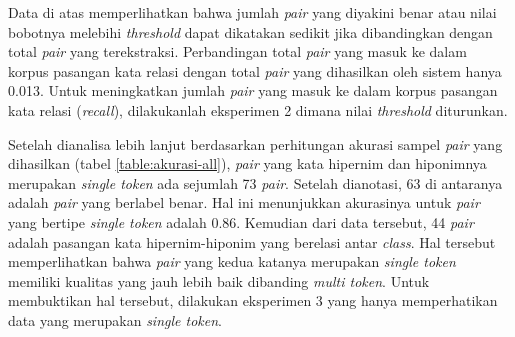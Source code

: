 Data di atas memperlihatkan bahwa jumlah \textit{pair} yang diyakini benar atau nilai bobotnya melebihi \textit{threshold} dapat dikatakan sedikit jika dibandingkan dengan total \textit{pair} yang terekstraksi. Perbandingan total \textit{pair} yang masuk ke dalam korpus pasangan kata relasi dengan total \textit{pair} yang dihasilkan oleh sistem hanya 0.013. Untuk meningkatkan jumlah \textit{pair} yang masuk ke dalam korpus pasangan kata relasi (\textit{recall}), dilakukanlah eksperimen 2 dimana nilai \textit{threshold} diturunkan.

Setelah dianalisa lebih lanjut berdasarkan perhitungan akurasi sampel \textit{pair} yang dihasilkan (tabel \ref{table:akurasi-all}), \textit{pair} yang kata hipernim dan hiponimnya merupakan \textit{single token} ada sejumlah 73 \textit{pair}. Setelah dianotasi, 63 di antaranya adalah \textit{pair} yang berlabel benar. Hal ini menunjukkan akurasinya untuk \textit{pair} yang bertipe \textit{single token} adalah 0.86. Kemudian dari data tersebut, 44 \textit{pair} adalah pasangan kata hipernim-hiponim yang berelasi antar \textit{class}. Hal tersebut memperlihatkan bahwa \textit{pair} yang kedua katanya merupakan \textit{single token} memiliki kualitas yang jauh lebih baik dibanding \textit{multi token}. Untuk membuktikan hal tersebut, dilakukan eksperimen 3 yang hanya memperhatikan data yang merupakan \textit{single token}.
%

